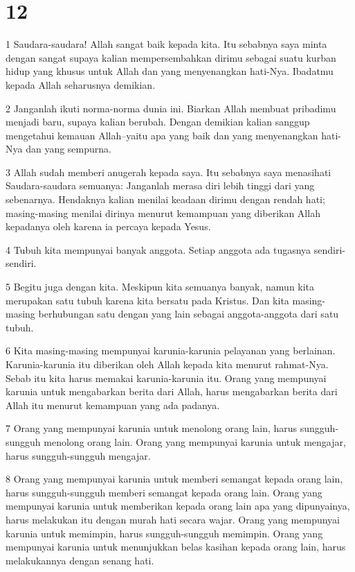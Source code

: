 \chapter{12}

\par 1 Saudara-saudara! Allah sangat baik kepada kita. Itu sebabnya saya minta dengan sangat supaya kalian mempersembahkan dirimu sebagai suatu kurban hidup yang khusus untuk Allah dan yang menyenangkan hati-Nya. Ibadatmu kepada Allah seharusnya demikian.
\par 2 Janganlah ikuti norma-norma dunia ini. Biarkan Allah membuat pribadimu menjadi baru, supaya kalian berubah. Dengan demikian kalian sanggup mengetahui kemauan Allah--yaitu apa yang baik dan yang menyenangkan hati-Nya dan yang sempurna.
\par 3 Allah sudah memberi anugerah kepada saya. Itu sebabnya saya menasihati Saudara-saudara semuanya: Janganlah merasa diri lebih tinggi dari yang sebenarnya. Hendaknya kalian menilai keadaan dirimu dengan rendah hati; masing-masing menilai dirinya menurut kemampuan yang diberikan Allah kepadanya oleh karena ia percaya kepada Yesus.
\par 4 Tubuh kita mempunyai banyak anggota. Setiap anggota ada tugasnya sendiri-sendiri.
\par 5 Begitu juga dengan kita. Meskipun kita semuanya banyak, namun kita merupakan satu tubuh karena kita bersatu pada Kristus. Dan kita masing-masing berhubungan satu dengan yang lain sebagai anggota-anggota dari satu tubuh.
\par 6 Kita masing-masing mempunyai karunia-karunia pelayanan yang berlainan. Karunia-karunia itu diberikan oleh Allah kepada kita menurut rahmat-Nya. Sebab itu kita harus memakai karunia-karunia itu. Orang yang mempunyai karunia untuk mengabarkan berita dari Allah, harus mengabarkan berita dari Allah itu menurut kemampuan yang ada padanya.
\par 7 Orang yang mempunyai karunia untuk menolong orang lain, harus sungguh-sungguh menolong orang lain. Orang yang mempunyai karunia untuk mengajar, harus sungguh-sungguh mengajar.
\par 8 Orang yang mempunyai karunia untuk memberi semangat kepada orang lain, harus sungguh-sungguh memberi semangat kepada orang lain. Orang yang mempunyai karunia untuk memberikan kepada orang lain apa yang dipunyainya, harus melakukan itu dengan murah hati secara wajar. Orang yang mempunyai karunia untuk memimpin, harus sungguh-sungguh memimpin. Orang yang mempunyai karunia untuk menunjukkan belas kasihan kepada orang lain, harus melakukannya dengan senang hati.
